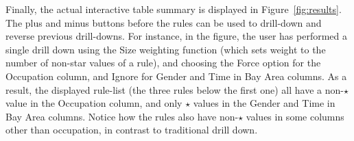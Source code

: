 Finally, the actual interactive table summary is displayed in Figure~\ref{fig:results}. The plus and minus buttons before the rules can be used to drill-down and reverse previous drill-downs. For instance, in the figure, the user has performed a single drill down using the Size weighting function (which sets weight to the number of non-star values of a rule), and choosing the Force option for the Occupation column, and Ignore for Gender and Time in Bay Area columns. As a result, the displayed rule-list (the three rules below the first one) all have a non-$\star$ value in the Occupation column, and only $\star$ values in the Gender and Time in Bay Area columns. Notice how the rules also have non-$\star$ values in some columns other than occupation, in contrast to traditional drill down.

